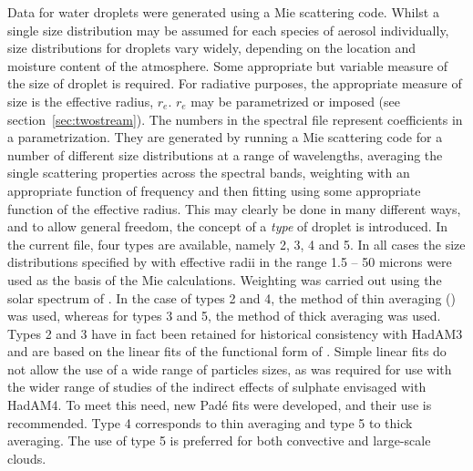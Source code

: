 \begin{enumerate}
Data for water droplets were generated using a Mie scattering code. 
Whilst a single size distribution may be assumed for each species
of aerosol individually, size distributions for droplets vary widely,
depending on the location and moisture content of the atmosphere. Some
appropriate but variable measure of the size of droplet is required.
For radiative purposes, the
appropriate measure of size is the effective radius, $r_e$. $r_e$
may be parametrized or imposed (see section~\ref{sec:twostream}). The numbers in the
spectral file represent coefficients in a parametrization. They
are generated by running a Mie scattering code for a number of different
size distributions at a range of wavelengths, averaging the single
scattering properties across the spectral bands, weighting with an
appropriate function of frequency and then fitting using some appropriate
function of the effective radius. This may clearly be done in many
different ways, and to allow general freedom, the concept of a {\em
type} of droplet is introduced. In the current file, four types are available,
namely 2, 3, 4 and 5. In all cases the size distributions specified by 
\citet{Rockel91} with effective
radii in the range 1.5 -- 50 microns 
were used as the basis of the Mie calculations. Weighting
was carried out using the solar spectrum of \citet{Labs70}. In the case of
types 2 and 4, the method of thin averaging (\citet{Edwards96rc}) was used,
whereas for types 3 and 5, the method of thick averaging was used. 
Types 2 and 3 have in fact been retained for historical consistency with
HadAM3 and are based on the linear fits of the functional form of
\citet{Slingo82}. Simple linear fits do not allow the use of a wide range
of particles sizes, as was required for use with the wider range of
studies of the indirect effects of sulphate envisaged with HadAM4.
To meet this need, new Pad\'e fits were developed, and their use is 
recommended. Type 4 corresponds to thin averaging and type 5 to thick
averaging. The use of type 5 is preferred for both convective and large-scale
clouds.


\end{enumerate}
